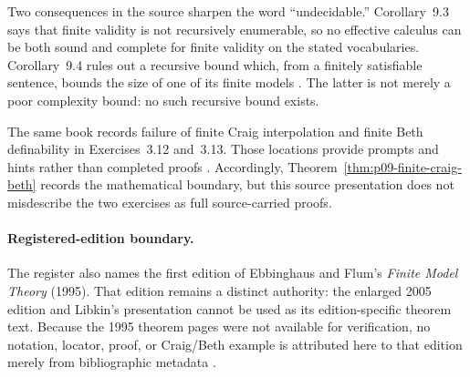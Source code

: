 Two consequences in the source sharpen the word ``undecidable.''  Corollary~9.3
says that finite validity is not recursively enumerable, so no effective
calculus can be both sound and complete for finite validity on the stated
vocabularies.  Corollary~9.4 rules out a recursive bound which, from a finitely
satisfiable sentence, bounds the size of one of its finite models
\cite[pp.~165--166]{Libkin2004}.  The latter is not merely a poor complexity
bound: no such recursive bound exists.

The same book records failure of finite Craig interpolation and finite Beth
definability in Exercises~3.12 and~3.13.  Those locations provide prompts and
hints rather than completed proofs \cite[pp.~41--42]{Libkin2004}.  Accordingly,
Theorem~\ref{thm:p09-finite-craig-beth} records the mathematical boundary, but
this source presentation does not misdescribe the two exercises as full
source-carried proofs.

\paragraph{Registered-edition boundary.}
The register also names the first edition of Ebbinghaus and Flum's
\emph{Finite Model Theory} (1995).  That edition remains a distinct authority:
the enlarged 2005 edition and Libkin's presentation cannot be used as its
edition-specific theorem text.  Because the 1995 theorem pages were not
available for verification, no notation, locator, proof, or Craig/Beth example
is attributed here to that edition merely from bibliographic metadata
\cite{EbbinghausFlum1995}.

